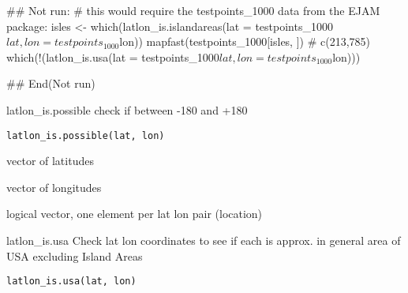 \documentclass[a4paper]{book}
\begin{document}
%
\begin{Examples}
\begin{ExampleCode}
## Not run: 
# this would require the testpoints_1000 data from the EJAM package:
  isles <- which(latlon_is.islandareas(lat = testpoints_1000$lat, lon = testpoints_1000$lon))
  mapfast(testpoints_1000[isles, ]) # c(213,785) 
  which(!(latlon_is.usa(lat = testpoints_1000$lat, lon = testpoints_1000$lon)))

## End(Not run)
  
\end{ExampleCode}
\end{Examples}
%
\begin{Description}\relax
latlon\_is.possible
check if between -180 and +180
\end{Description}
%
\begin{Usage}
\begin{verbatim}
latlon_is.possible(lat, lon)
\end{verbatim}
\end{Usage}
%
\begin{Arguments}
\begin{ldescription}
\item[\code{lat}] vector of latitudes

\item[\code{lon}] vector of longitudes
\end{ldescription}
\end{Arguments}
%
\begin{Value}
logical vector, one element per lat lon pair (location)
\end{Value}
%
\begin{SeeAlso}\relax
{}   
\end{SeeAlso}
%
\begin{Description}\relax
latlon\_is.usa
Check lat lon coordinates to see if each is approx. in general area of USA excluding Island Areas
\end{Description}
%
\begin{Usage}
\begin{verbatim}
latlon_is.usa(lat, lon)
\end{verbatim}
\end{Usage}
\end{document}
